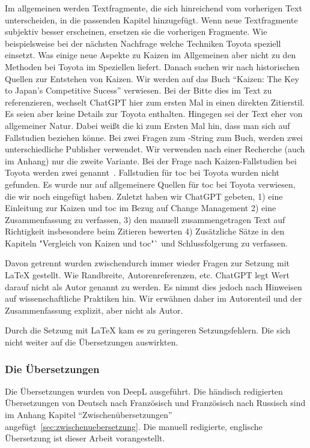 Im allgemeinen werden Textfragmente, die sich hinreichend vom vorherigen Text unterscheiden, in die passenden Kapitel hinzugefügt. Wenn neue Textfragmente subjektiv besser erscheinen, ersetzen sie die vorherigen Fragmente. Wie beispielsweise bei der nächsten Nachfrage welche Techniken Toyota speziell einsetzt. Was einige neue Aspekte zu Kaizen im Allgemeinen aber nicht zu den Methoden bei Toyota im Speziellen liefert.
Danach suchen wir nach historischen Quellen zur Entstehen von Kaizen. Wir werden auf das Buch "`Kaizen: The Key to Japan's Competitive Sucess"' \cite{imai1986kaizen} verwiesen. Bei der Bitte dies im Text zu referenzieren, wechselt ChatGPT hier zum ersten Mal in einen direkten Zitierstil. Es seien aber keine Details zur Toyota enthalten. Hingegen sei der Text eher von allgemeiner Natur. Dabei weißt die \gls{ki} zum Ersten Mal hin, dass man sich auf Fallstudien beziehen könne. Bei zwei Fragen zum \BibTeX{}-String zum Buch, werden zwei unterschiedliche Publisher verwendet. Wir verwenden nach einer Recherche (auch im Anhang) nur die zweite Variante. Bei der Frage nach Kaizen-Fallstudien bei Toyota werden zwei genannt~\cite{ibscmr2003toyotakaizen, casecentre2002toyotakaizen}. Fallstudien für \gls{toc} bei Toyota wurden nicht gefunden. Es wurde nur auf allgemeinere Quellen für \gls{toc} bei Toyota verwiesen, die wir noch eingefügt haben.
Zuletzt haben wir ChatGPT gebeten, 1) eine Einleitung zur Kaizen und \gls{toc} im Bezug auf Change Management 2) eine Zusammenfassung zu verfassen, 3) den manuell zusammengetragen Text auf Richtigkeit insbesondere beim Zitieren  bewerten 4) Zusätzliche Sätze in den Kapiteln "Vergleich von Kaizen und \gls{toc}"` und Schlussfolgerung zu verfassen.

Davon getrennt wurden zwischendurch immer wieder Fragen zur Setzung mit \LaTeX{} gestellt. Wie Randbreite, Autorenreferenzen, etc. ChatGPT legt Wert darauf nicht als Autor genannt zu werden. Es nimmt dies jedoch nach Hinweisen auf wissenschaftliche Praktiken hin. Wir erwähnen daher im Autorenteil und der Zusammenfassung explizit, aber nicht als Autor.

Durch die Setzung mit \LaTeX{} kam es zu geringeren Setzungsfehlern. Die sich nicht weiter auf die Übersetzungen auswirkten.

\subsubsection{Die Übersetzungen}

Die Übersetzungen wurden von DeepL ausgeführt. Die händisch redigierten Übersetzungen von Deutsch nach Französisch und Französisch nach Russisch sind im Anhang Kapitel "`Zwischenübersetzungen"' angefügt~\ref{sec:zwischenuebersetzung}. Die manuell redigierte, englische Übersetzung ist dieser Arbeit vorangestellt. 

